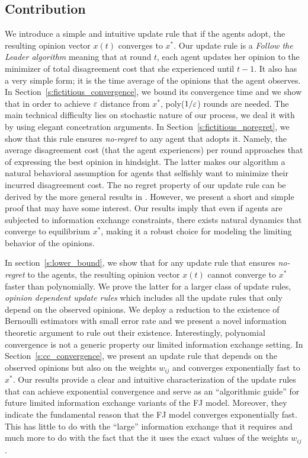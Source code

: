 \subsection{Contribution}

We introduce a simple and intuitive update rule that if the agents adopt, the
resulting opinion vector $x(t)$ converges to $x^*$.  Our update rule is a
\emph{Follow the Leader algorithm} meaning that at round $t$, each agent
updates her opinion to the minimizer of total disagreement cost that she
experienced until $t-1$. It also has a very simple form; it is the time average
of the opinions that the agent observes.  In
Section~\ref{s:fictitious_convergence}, we bound its convergence time and we
show that in order to achieve $\varepsilon$ distance from $x^*$, poly($1/\varepsilon$) rounds
are needed. The main technical difficulty lies on stochastic nature of our
process, we deal it with by using elegant concetration arguments.  In
Section~\ref{s:fictitious_noregret}, we show that this rule ensures
\emph{no-regret} to any agent that adopts it. Namely, the average disagreement
cost (that the agent experiences) per round approaches that of expressing the
best opinion in hindsight. The latter makes our algorithm a natural behavioral
assumption for agents that selfishly want to minimize their incurred
disagreement cost.  The no regret property of our update rule can be derived by
the more general results in \cite{HAK07}.  However, we present a short and
simple proof that may have some interest. Our results imply that even if agents
are subjected to information exchange constraints, there exists natural
dynamics that converge to equilibrium $x^*$, making it a robust choice for
modeling the limiting behavior of the opinions.

In section~\ref{s:lower_bound}, we show that for any update rule that ensures
\emph{no-regret} to the agents, the resulting opinion vector $x(t)$ cannot
converge to $x^*$ faster than polynomially.  We prove the latter for a larger
class of update rules, \emph{opinion dependent update rules} which includes all
the update rules that only depend on the observed opinions.  We deploy a
reduction to the existence of Bernoulli estimators with small error rate and we
present a novel information theoretic argument to rule out their existence.
Interestingly, polynomial convergence is not a generic property our limited
information exchange setting.  In Section~\ref{s:cc_convergence}, we present an
update rule that depends on the observed opinions but also on the weights
$w_{ij}$ and converges exponentially fast to $x^*$. Our results provide a clear
and intuitive characterization of the update rules that can achieve exponential
convergence and serve as an \enquote{algorithmic guide} for future limited
information exchange variants of the FJ model.  Moreover, they indicate the
fundamental reason that the FJ model converges exponentially fast. This has
little to do with the \enquote{large} information exchange that it requires and
much more to do with the fact that the it uses the exact values of the weights
$w_{ij}$.

